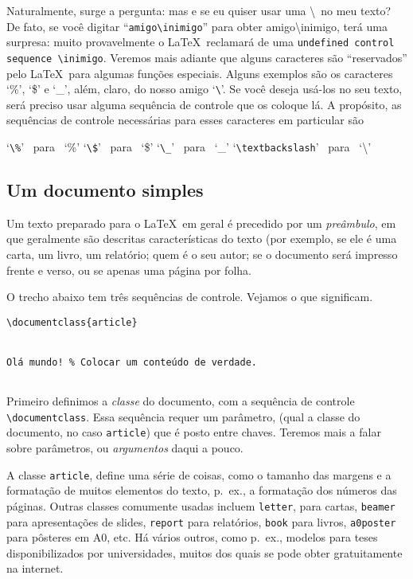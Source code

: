 Naturalmente, surge a pergunta: mas e se eu quiser usar uma
\textbackslash\ no meu texto? De fato, se você digitar
``\verb|amigo\inimigo|'' para obter amigo\textbackslash inimigo, terá
uma surpresa: muito provavelmente o \LaTeX\ reclamará de uma
\verb!undefined control sequence \inimigo!. Veremos mais adiante que
alguns caracteres são ``reservados'' pelo \LaTeX\ para algumas funções
especiais. Alguns exemplos são os caracteres `\%', `\$' e `\_', além,
claro, do nosso amigo `\verb|\|'. Se você deseja usá-los no seu texto,
será preciso usar alguma sequência de controle que os coloque lá. A
propósito, as sequências de controle necessárias para esses caracteres
em particular são

\begin{center}
  `\verb|\%|' \ para \ `\%'%
  \qquad`\verb|\$|' \ para  \ `\$'%
  \qquad`\verb|\_|\negthinspace' \ para \ `\_'%
  \qquad`\verb|\textbackslash|' \ para \ `\textbackslash'\qquad
\end{center}

\subsection{Um documento simples}

Um texto preparado para o \LaTeX\ em geral é precedido por um
\emph{preâmbulo}, em que geralmente são descritas características do
texto (por exemplo, se ele é uma carta, um livro, um relatório; quem é
o seu autor; se o documento será impresso frente e verso, ou se apenas
uma página por folha.

O trecho abaixo tem três sequências de controle. Vejamos o que
significam. 

\begin{footnotesize}
\begin{verbatim}
\documentclass{article}


Olá mundo! % Colocar um conteúdo de verdade.


\end{verbatim}
\end{footnotesize}

Primeiro definimos a \emph{classe} do documento, com a
sequência de controle \verb|\documentclass|. Essa sequência requer um
parâmetro, (qual a classe do documento, no caso \verb!article!) que é
posto entre chaves. Teremos mais a falar sobre parâmetros, ou
\emph{argumentos} daqui a pouco.

A classe \verb!article!, define uma série
de coisas, como o tamanho das margens e a formatação de muitos
elementos do texto, p.~ex., a formatação dos números das páginas. Outras
classes comumente usadas incluem \verb!letter!, para cartas,
\verb!beamer! para apresentações de slides, \verb!report! para
relatórios, \verb!book! para livros, \verb!a0poster! para pôsteres em
A0, etc. Há vários outros, como p.~ex., modelos para teses
disponibilizados por universidades, muitos dos quais se pode obter
gratuitamente na internet.

